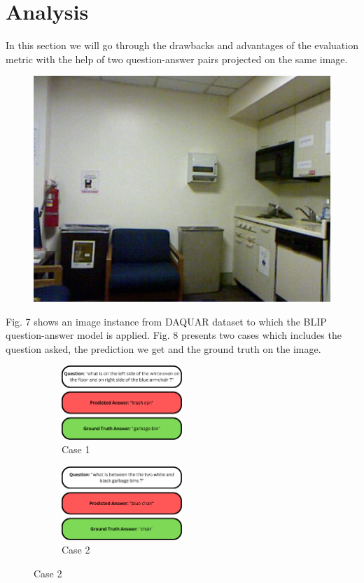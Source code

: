 \section{Analysis}
\label{sec:formatting}
In this section we will go through the drawbacks and advantages of the evaluation metric with the help of two question-answer pairs projected on the same image. 
\begin{figure}[htbp]
  \centering
   \includegraphics[width=0.75\linewidth]{sec/Images/image9.png}
   \caption{}
   \label{fig:onecol}
\end{figure}



Fig. 7 shows an image instance from DAQUAR dataset to which the BLIP question-answer model is applied. 
Fig. 8 presents two cases which includes the question asked, the prediction we get and the ground truth on the image.

\begin{figure}
    \centering
    \begin{subfigure}{0.5\textwidth}
        \centering
        \includegraphics[width=0.5\textwidth]{sec/Images/image10.png}
        \caption{Case 1}
        \label{fig:sub1}
    \end{subfigure}
    \hfill
    \begin{subfigure}{0.5\textwidth}
        \centering
        \includegraphics[width=0.5\textwidth]{sec/Images/image11.png}
        \caption{Case 2}
        \label{fig:sub2}
    \end{subfigure}
    \label{fig:whole}
\end{figure}


